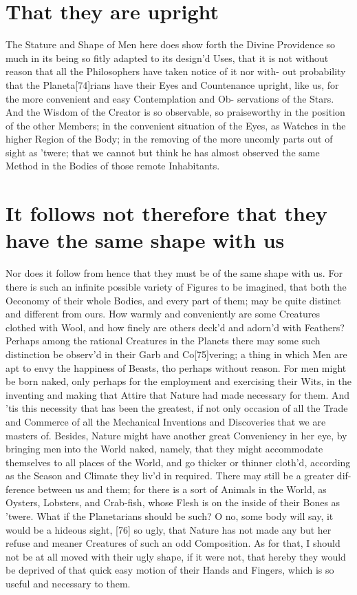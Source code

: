 \documentclass[letterpaper]{book}
\begin{document}
\section{That they are upright}

The Stature and Shape of Men here does show forth the Divine Providence
so much in its being so fitly adapted to its design'd Uses, that it is not
without reason that all the Philosophers have taken notice of it nor with-
out probability that the Planeta[74]rians have their Eyes and Countenance
upright, like us, for the more convenient and easy Contemplation and Ob-
servations of the Stars. And the Wisdom of the Creator is so observable,
so praiseworthy in the position of the other Members; in the convenient
situation of the Eyes, as Watches in the higher Region of the Body; in the
removing of the more uncomly parts out of sight as 'twere; that we cannot
but think he has almost observed the same Method in the Bodies of those
remote Inhabitants.


\section{It follows not therefore that they have the same shape with us} 

Nor does it follow from hence that they must be of the same shape with us.
For there is such an infinite possible variety of Figures to be imagined,
that both the Oeconomy of their whole Bodies, and every part of them; may be
quite distinct and different from ours. How warmly and conveniently are some
Creatures clothed with Wool, and how finely are others deck'd and adorn'd
with Feathers? Perhaps among the rational Creatures in the Planets there may
some such distinction be observ'd in their Garb and Co[75]vering; a thing in
which Men are apt to envy the happiness of Beasts, tho perhaps without
reason. For men might be born naked, only perhaps for the employment and
exercising their Wits, in the inventing and making that Attire that Nature
had made necessary for them. And 'tis this necessity that has been the
greatest, if not only occasion of all the Trade and Commerce of all the
Mechanical Inventions and Discoveries that we are masters of. Besides,
Nature might have another great Conveniency in her eye, by bringing men into
the World naked, namely, that they might accommodate themselves to all
places of the World, and go thicker or thinner cloth'd, according as the
Season and Climate they liv'd in required. There may still be a greater dif-
ference between us and them; for there is a sort of Animals in the World, as
Oysters, Lobsters, and Crab-fish, whose Flesh is on the inside of their
Bones as 'twere. What if the Planetarians should be such? O no, some body
will say, it would be a hideous sight, [76] so ugly, that Nature has not
made any but her refuse and meaner Creatures of such an odd Composition. As
for that, I should not be at all moved with their ugly shape, if it were
not, that hereby they would be deprived of that quick easy motion of their
Hands and Fingers, which is so useful and necessary to them.
\end{document}
